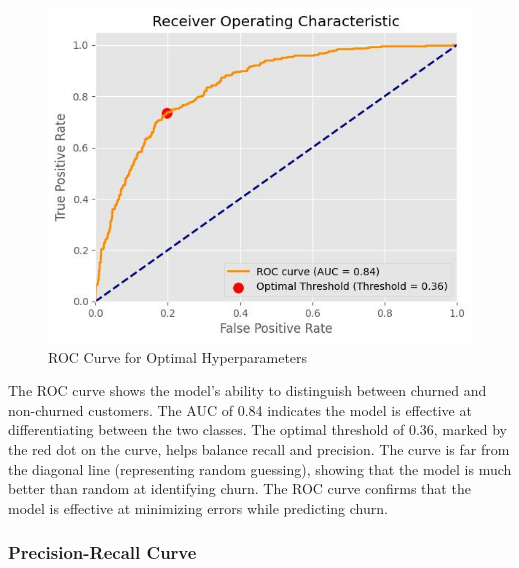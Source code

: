 \begin{figure}[hbt!]
    \centering
    \includegraphics[width=1\linewidth]{Images/5.7.4.a.jpg}
    \caption{ROC Curve for Optimal Hyperparameters}
    \label{fig:enter-label}
\end{figure}

The ROC curve shows the model’s ability to distinguish between churned and non-churned customers. The AUC of 0.84 indicates the model is effective at differentiating between the two classes. The optimal threshold of 0.36, marked by the red dot on the curve, helps balance recall and precision. The curve is far from the diagonal line (representing random guessing), showing that the model is much better than random at identifying churn. The ROC curve confirms that the model is effective at minimizing errors while predicting churn.

\subsubsection{Precision-Recall Curve}

